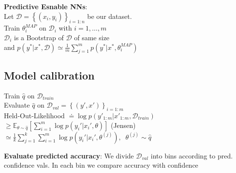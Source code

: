 \textbf{Predictive Esnable NNs}: \\
Let $\mathcal{D} = \left\{(x_i,y_i)\right\}_{i=1:n}$ be our dataset. \\
Train $\theta_i^{MAP}$ on $\mathcal{D}_i$ with $ i=1,\dots,m$\\
$\mathcal{D}_i$ is a Bootstrap of $\mathcal{D}$ of same size\\
and $p(y^*\vert x^*, \mathcal{D})\simeq \frac{1}{m}\sum_{j=1}^m p(y^*\vert x^*, \theta^{MAP}_i)$ 


\subsection{Model calibration}
Train $\hat q$ on $\mathcal{D}_{train}$ \\
Evaluate $\hat q$ on $\mathcal{D}_{val}= \left\{(y',x')\right\}_{i=1:m}$\\
Held-Out-Likelihood $\doteq \log{p(y'_{1:m} \vert x'_{1:m} , \mathcal{D}_{train})}$ \\
$\geq \mathbb{E}_{\theta \sim \hat q}\left[\sum_{i=1}^m\log{p(y_i'\vert x_i', \theta)}\right]$ (Jensen)\\
$\simeq \frac{1}{k}\sum_{j=1}^k\sum_{i=1}^m\log{p(y_i'\vert x_i', \theta^{(j)})}, \;\; \theta^{(j)} \sim \hat q$

\textbf{Evaluate predicted accuracy}: We divide $\mathcal{D}_{val}$ into bins according to pred. confidence vals. In each bin we compare accuracy with confidence

